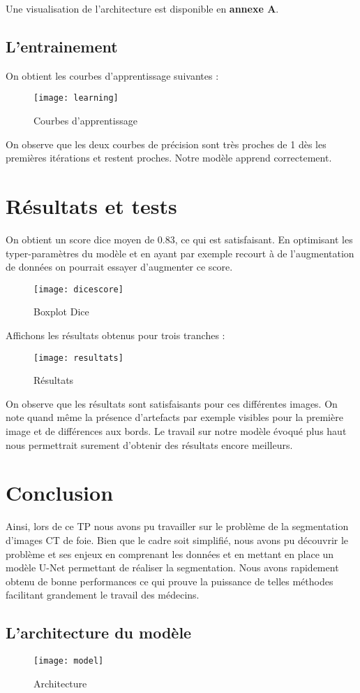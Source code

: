 \documentclass[12pt,a4paper,titlepage]{scrartcl}
\begin{document}
Une visualisation de l'architecture est disponible en \textbf{annexe A}.

\subsection{L'entrainement}

On obtient les courbes d'apprentissage suivantes :

\begin{figure}[H]
    \caption{Courbes d'apprentissage}
    \texttt{[image: learning]}
    \centering
\end{figure}

On observe que les deux courbes de précision sont très proches de 1 dès les premières itérations et restent
proches. Notre modèle apprend correctement.

\section{Résultats et tests}

On obtient un score dice moyen de 0.83, ce qui est satisfaisant. En optimisant les typer-paramètres
du modèle et en ayant par exemple recourt à de l'augmentation de données on pourrait essayer
d'augmenter ce score.

\begin{figure}[H]
    \caption{Boxplot Dice}
    \texttt{[image: dicescore]}
    \centering
\end{figure}

Affichons les résultats obtenus pour trois tranches :

\begin{figure}[H]
    \caption{Résultats}
    \texttt{[image: resultats]}
    \centering
\end{figure}

On observe que les résultats sont satisfaisants pour ces différentes images. On note quand
même la présence d'artefacts par exemple visibles pour la première image et de différences aux
bords. Le travail sur notre modèle évoqué plus haut nous permettrait surement d'obtenir des résultats
encore meilleurs.

\section*{Conclusion}

Ainsi, lors de ce TP nous avons pu travailler sur le problème de la segmentation d'images CT
de foie. Bien que le cadre soit simplifié, nous avons pu découvrir le problème et ses enjeux
en comprenant les données et en mettant en place un modèle U-Net permettant de réaliser la
segmentation. Nous avons rapidement obtenu de bonne performances ce qui prouve la
puissance de telles méthodes facilitant grandement le travail des médecins.

\begin{appendices}

    \section{L'architecture du modèle}

    \begin{figure}[H]
        \caption{Architecture}
        \texttt{[image: model]}
        \centering
    \end{figure}

\end{appendices}
\end{document}

